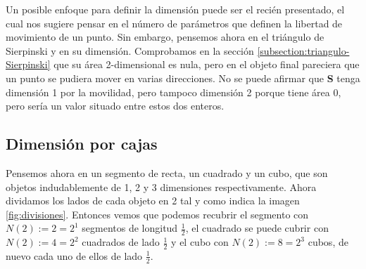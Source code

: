Un posible enfoque para definir la dimensión puede ser el recién presentado, el cual nos sugiere pensar en el número de parámetros que definen la libertad de movimiento de un punto. Sin embargo, pensemos ahora en el triángulo de Sierpinski y en su dimensión. Comprobamos en la sección \ref{subsection:triangulo-Sierpinski} que su área 2-dimensional es nula, pero en el objeto final pareciera que un punto se pudiera mover en varias direcciones. No se puede afirmar que \textbf{S} tenga dimensión 1 por la movilidad, pero tampoco dimensión 2 porque tiene área 0, pero sería un valor situado entre estos dos enteros.

\subsection{Dimensión por cajas}
\label{subsection:dim-cajas}

Pensemos ahora en un segmento de recta, un cuadrado y un cubo, que son objetos indudablemente de 1, 2 y 3 dimensiones respectivamente. Ahora dividamos los lados de cada objeto en 2 tal y como indica la imagen \ref{fig:divisiones}. Entonces vemos que podemos recubrir el segmento con $N(2):=2=2^1$ segmentos de longitud $\frac{1}{2}$, el cuadrado se puede cubrir con $N(2):=4=2^2$ cuadrados de lado $\frac{1}{2}$ y el cubo con $N(2):=8=2^3$ cubos, de nuevo cada uno de ellos de lado $\frac 1 2$.

